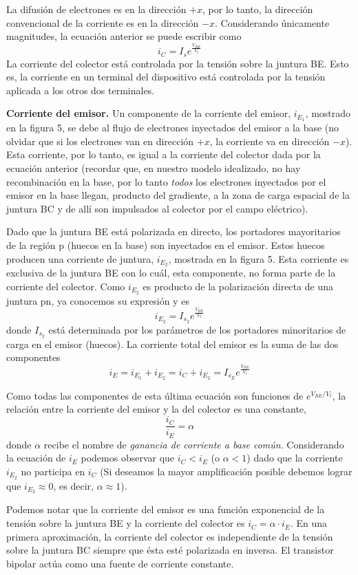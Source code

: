 \documentclass[12pt,a4paper]{article}
\begin{document}
La difusión de electrones es en la dirección $+x$, por lo tanto, la dirección convencional de la corriente es en la dirección $-x$. Considerando únicamente magnitudes, la ecuación anterior se puede escribir como
\[ i_{C}= I_{s} e^{\frac{V_{BE}}{V_{t}}} \]
La corriente del colector está controlada por la tensión sobre la juntura BE. Esto es, la corriente en un terminal del dispositivo está controlada por la tensión aplicada a los otros dos terminales.

\textbf{Corriente del emisor.} Un componente de la corriente del emisor, $i_{E_{1}}$, mostrado en la figura 5, se debe al flujo de electrones inyectados del emisor a la base (no olvidar que si los electrones van en dirección $+x$, la corriente va en dirección $-x$). Esta corriente, por lo tanto, es igual a la corriente del colector dada por la ecuación anterior (recordar que, en nuestro modelo idealizado, no hay recombinación en la base, por lo tanto \emph{todos} los electrones inyectados por el emisor en la base llegan, producto del gradiente, a la zona de carga espacial de la juntura BC y de allí son impulsados al colector por el campo eléctrico).

Dado que la juntura BE está polarizada en directo, los portadores mayoritarios de la región p (huecos en la base) son inyectados en el emisor. Estos huecos producen una corriente de juntura, $i_{E_{2}}$, mostrada en la figura 5. Esta corriente es exclusiva de la juntura BE con lo cuál, esta componente, no forma parte de la corriente del colector. Como $i_{E_{2}}$ es producto de la polarización directa de una juntura pn, ya conocemos su expresión y es
\[ i_{E_{2}}=I_{s_{2}}e^{\frac{V_{BE}}{V_{t}}} \]
donde $I_{s_{2}}$ está determinada por los parámetros de los portadores minoritarios de carga en el emisor (huecos). La corriente total del emisor es la suma de las dos componentes
\[ i_{E}=i_{E_{1}}+i_{E_{2}}=i_{C}+i_{E_{2}}=I_{s_{E}} e^{\frac{V_{BE}}{V_{t}}} \]

Como todas las componentes de esta última ecuación son funciones de $e^{V_{BE}/V_{t}}$, la relación entre la corriente del emisor y la del colector es una constante,
\[ \frac{i_{C}}{i_{E}}=\alpha \]
donde $\alpha$ recibe el nombre de \emph{ganancia de corriente a base común}. Considerando la ecuación de $i_{E}$ podemos observar que $i_{C}<i_{E}$ (o $\alpha <1$) dado que la corriente $i_{E_{2}}$ no participa en $i_{C}$ (Si deseamos la mayor amplificación posible debemos lograr que $i_{E_{2}} \approx 0$, es decir, $\alpha \approx 1$).

Podemos notar que la corriente del emisor es una función exponencial de la tensión sobre la juntura BE y la corriente del colector es $i_{C}=\alpha \cdot i_{E}$. En una primera aproximación, la corriente del colector es independiente de la tensión sobre la juntura BC siempre que ésta esté polarizada en inversa. El transistor bipolar actúa como una fuente de corriente constante.
\end{document}
